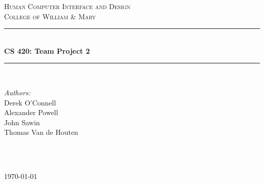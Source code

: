 \documentclass[5pt]{article} %
\begin{document}

\begin{titlepage}

\newcommand{\HRule}{\rule{\linewidth}{0.5mm}} %

\center %

\textsc{\Large Human Computer Interface and Design}\\[0.5cm] %
\textsc{\large College of William \& Mary}\\[0.5cm] %

\HRule \\[0.4cm]
{ \huge \bfseries CS 420: Team Project 2}\\[0.4cm] %
\HRule \\[1.5cm]

\begin{minipage}{0.4\textwidth}
\begin{flushleft} \large
\emph{Authors:}\\
Derek O'Connell \\
Alexander Powell \\
John Sawin \\
Thomas Van de Houten
\end{flushleft}
\end{minipage}
~
\begin{minipage}{0.4\textwidth}
\begin{flushright} \large
\end{flushright}
\end{minipage}\\[4cm]

{\large \today}\\[3cm] %


\vfill %

\end{titlepage}
\end{document}
